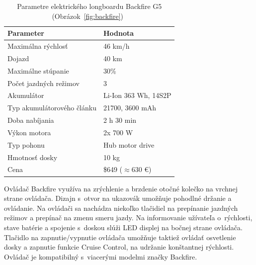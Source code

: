 \begin{table}[h]
    \centering
    \begin{tabular}{|l|l|}
        \hline
        \textbf{Parameter} & \textbf{Hodnota} \\ \hline
        Maximálna rýchlosť & 46 km/h \\ \hline
        Dojazd & 40 km \\ \hline
        Maximálne stúpanie & 30\% \\ \hline
        Počet jazdných režimov & 3 \\ \hline
        Akumulátor & Li-Ion 363 Wh, 14S2P \\ \hline
        Typ akumulátorového článku & 21700, 3600 mAh \\ \hline
        Doba nabíjania & 2 h 30 min \\ \hline
        Výkon motora & 2x 700 W \\ \hline
        Typ pohonu & Hub motor drive \\ \hline
        Hmotnosť dosky & 10 kg \\ \hline
        Cena & \$649 ($\approx$630 €) \\ \hline
    \end{tabular}
    \caption{Parametre elektrického longboardu Backfire G5 (Obrázok~\ref{fig:backfire})~\cite{Backfire}}\label{tab:backfire}
\end{table}

Ovládač Backfire využíva na zrýchlenie a brzdenie otočné kolečko na vrchnej strane ovládača.
Dizajn s~otvor na ukazovák umožňuje pohodlné držanie a ovládanie.
Na ovládači sa nachádza niekoľko tlačidiel na prepínanie jazdných režimov a prepínač na zmenu smeru jazdy. 
Na informovanie užívateľa o~rýchlosti, stave batérie a spojenie s~doskou slúži LED displej na bočnej strane ovládača.
Tlačidlo na zapnutie/vypnutie ovládača umožňuje taktiež ovládať osvetlenie dosky a zapnutie funkcie Cruise Control, na udržanie konštantnej rýchlosti.
Ovládač je kompatibilný s~viacerými modelmi značky Backfire.

